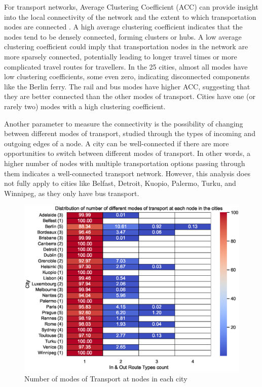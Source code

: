 \documentclass{article}
\theoremstyle{plain}
\theoremstyle{definition}
\theoremstyle{remark}
\begin{document}
For transport networks, Average Clustering Coefficient (ACC) can provide insight into the local connectivity of the network and the extent to which transportation nodes are connected \cite{frossard_2023a}. A high average clustering coefficient indicates that the nodes tend to be densely connected, forming clusters or hubs. A low average clustering coefficient could imply that transportation nodes in the network are more sparsely connected, potentially leading to longer travel times or more complicated travel routes for travellers. In the 25 cities, almost all modes have low clustering coefficients, some even zero, indicating disconnected components like the Berlin ferry. The rail and bus modes have higher ACC, suggesting that they are better connected than the other modes of transport. Cities have one (or rarely two) modes with a high clustering coefficient.

Another parameter to measure the connectivity is the possibility of changing between different modes of transport, studied through the types of incoming and outgoing edges of a node. A city can be well-connected if there are more opportunities to switch between different modes of transport. In other words, a higher number of nodes with multiple transportation options passing through them indicates a well-connected transport network. However, this analysis does not fully apply to cities like Belfast, Detroit, Kuopio, Palermo, Turku, and Winnipeg, as they only have bus transport. 

\begin{figure}[ht]
\vskip -0.1in
\begin{center}
\centerline{\includegraphics[width=\columnwidth]{images/intermodality_hm.eps}}
\caption{Number of modes of Transport at nodes in each city}
\label{intermode-node}
\end{center}
\vskip -0.3in
\end{figure}
\end{document}
